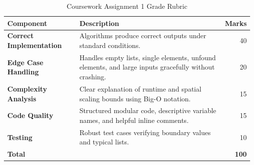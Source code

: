 \documentclass[11pt,a4paper]{article}
\begin{document}
\begin{table}[h]
    \centering
    \caption{Coursework Assignment 1 Grade Rubric}
    \vspace{0.2cm}
    \begin{tabular}{lp{10cm}r}
        \toprule
        \textbf{Component} & \textbf{Description} & \textbf{Marks} \\
        \midrule
        \textbf{Correct Implementation} & Algorithms produce correct outputs under standard conditions. & 40 \\
        \textbf{Edge Case Handling} & Handles empty lists, single elements, unfound elements, and large inputs gracefully without crashing. & 20 \\
        \textbf{Complexity Analysis} & Clear explanation of runtime and spatial scaling bounds using Big-O notation. & 15 \\
        \textbf{Code Quality} & Structured modular code, descriptive variable names, and helpful inline comments. & 15 \\
        \textbf{Testing} & Robust test cases verifying boundary values and typical lists. & 10 \\
        \midrule
        \textbf{Total} & & \textbf{100} \\
        \bottomrule
    \end{tabular}
\end{table}
\end{document}
